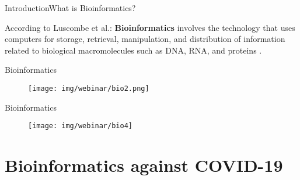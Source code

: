 \documentclass[10pt]{beamer}
\newcommand{\1}{
        	\setbeamertemplate{background}{
        		\texttt{[image: img/1]}
        		\tikz[overlay] \fill[fill opacity=0.75,fill=white] (0,0) rectangle (-\paperwidth,\paperheight);
        	}
}
\begin{document}
\begin{frame}{Introduction}{What is Bioinformatics?}
	
	According to Luscombe et al.: \textbf{Bioinformatics} involves the technology that uses computers for storage, retrieval, manipulation, and distribution of information related to biological macromolecules such as DNA, RNA, and proteins \cite{luscombe2001bioinformatics}.
	
\end{frame}



\begin{frame}{Bioinformatics}
	\begin{figure}[]
		\centering
		\texttt{[image: img/webinar/bio2.png]}
		\label{img:mot2}
	\end{figure}
\end{frame}


\begin{frame}{Bioinformatics}
	\begin{figure}[]
		\centering
		\texttt{[image: img/webinar/bio4]}
		\label{img:mot2}
	\end{figure}
\end{frame}


\section{Bioinformatics against COVID-19}
\end{document}
